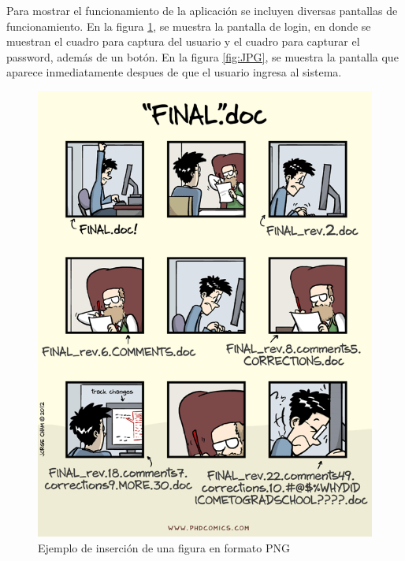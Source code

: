 \documentclass[conference]{IEEEtran}
\begin{document}
Para mostrar el funcionamiento de la aplicación se incluyen diversas pantallas de funcionamiento. En la figura \ref{fig:PNG}, se muestra la pantalla de login, en donde se muestran el cuadro para captura del usuario y el cuadro para capturar el password, además de un botón. En la figura \ref{fig:JPG}, se muestra la pantalla que aparece inmediatamente despues de que el usuario ingresa al sistema.

%
%
% 
\begin{figure}
\includegraphics*[width=\breite \columnwidth]{phd101212s} 
\caption{Ejemplo de inserción de una figura en formato PNG }
\label{fig:PNG}
\end{figure}
\end{document}
